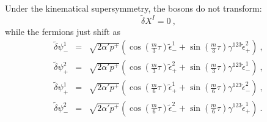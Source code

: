 \documentclass[a4paper,12pt]{article}
\begin{document}
Under the kinematical supersymmetry, the bosons do not transform:
\begin{equation}
\tilde{\delta} X^I = 0~,
\label{kinst1}
\end{equation}
while the fermions just shift as
\begin{eqnarray}
\tilde{\delta} \psi^1_-
 &=& \sqrt{2 \alpha' p^+} 
    \left(
     \cos \left( \frac{m}{3} \tau \right)
       \tilde{\epsilon}^1_-
    +\sin \left( \frac{m}{3} \tau \right) \gamma^{123}
       \tilde{\epsilon}^2_+
    \right)~,
\nonumber \\
\tilde{\delta} \psi^2_+
 &=& \sqrt{2 \alpha' p^+} 
    \left(
     \cos \left( \frac{m}{3} \tau \right)
       \tilde{\epsilon}^2_+
    +\sin \left( \frac{m}{3} \tau \right) \gamma^{123}
       \tilde{\epsilon}^1_-
    \right)~,
\nonumber \\
\tilde{\delta} \psi^1_+
 &=& \sqrt{2 \alpha' p^+} 
    \left(
     \cos \left( \frac{m}{6} \tau \right)
       \tilde{\epsilon}^1_+
    +\sin \left( \frac{m}{6} \tau \right) \gamma^{123}
       \tilde{\epsilon}^2_-
    \right)~,
\nonumber \\
\tilde{\delta} \psi^2_-
 &=& \sqrt{2 \alpha' p^+} 
    \left(
     \cos \left( \frac{m}{6} \tau \right)
       \tilde{\epsilon}^2_-
    +\sin \left( \frac{m}{6} \tau \right) \gamma^{123}
       \tilde{\epsilon}^1_+
    \right)~.
\label{kinst2}
\end{eqnarray}
\end{document}
